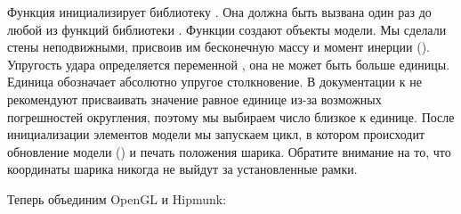 Функция  инициализирует библиотеку .
Она должна быть вызвана один раз до любой из функций библиотеки
. Функции  создают 
объекты модели. Мы сделали стены неподвижными, присвоив
им бесконечную массу и момент инерции (). 
Упругость удара определяется переменной ,
она не может быть больше единицы. Единица обозначает
абсолютно упругое столкновение. В документации к 
не рекомендуют присваивать значение равное единице из-за
возможных погрешностей округления, поэтому мы выбираем число
близкое к единице. После инициализации элементов модели 
мы запускаем цикл, в котором происходит обновление модели ()
и печать положения шарика. Обратите внимание на то, что 
координаты шарика никогда не выйдут за установленные рамки.

Теперь объединим OpenGL и Hipmunk:

